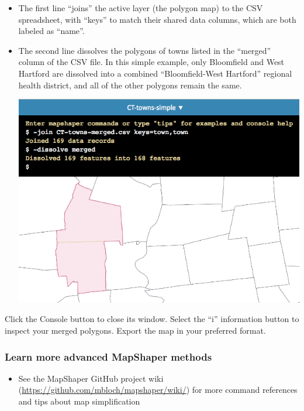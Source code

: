 \documentclass[
  english,
]{book}
\providecommand{\tightlist}{%
  \setlength{\itemsep}{0pt}\setlength{\parskip}{0pt}}
\begin{document}
\begin{itemize}
\item
  The first line ``joins'' the active layer (the polygon map) to the CSV spreadsheet, with ``keys'' to match their shared data columns, which are both labeled as ``name''.
\item
  The second line dissolves the polygons of towns listed in the ``merged'' column of the CSV file. In this simple example, only Bloomfield and West Hartford are dissolved into a combined ``Bloomfield-West Hartford'' regional health district, and all of the other polygons remain the same.

  \includegraphics{images/09-transform/mapshaper-towns-merged.png}
\end{itemize}

Click the Console button to close its window. Select the ``i'' information button to inspect your merged polygons. Export the map in your preferred format.

\hypertarget{learn-more-advanced-mapshaper-methods}{%
\subsubsection*{Learn more advanced MapShaper methods}\label{learn-more-advanced-mapshaper-methods}}

\begin{itemize}
\tightlist
\item
  See the MapShaper GitHub project wiki (\url{https://github.com/mbloch/mapshaper/wiki/}) for more command references and tips about map simplification
\end{itemize}
\end{document}
